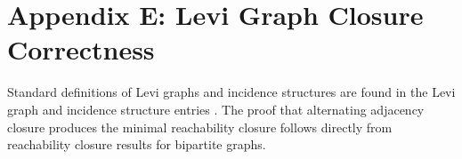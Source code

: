 \section{Appendix E: Levi Graph Closure Correctness}
\label{app:levi-closure}

Standard definitions of Levi graphs and incidence structures are found in the Levi graph and incidence structure entries \cite{WikipediaLeviGraph}. The proof that alternating adjacency closure produces the minimal reachability closure follows directly from reachability closure results for bipartite graphs.

